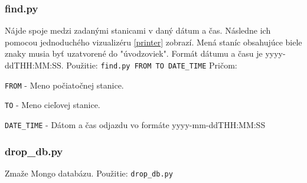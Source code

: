 \documentclass[10pt,xcolor=pdflatex,dvipsnames,table,oneside]{book}
\begin{document}
\subsubsection*{find.py}\label{printer}
\par Nájde spoje medzi zadanými stanicami v daný dátum a čas. Následne ich pomocou jednoduchého vizualizéru \ref{printer} zobrazí. Mená staníc obsahujúce biele znaky musia byť uzatvorené do "úvodzoviek". Formát dátumu a času je yyyy-ddTHH:MM:SS. \newline \newline
Použitie: \verb|find.py FROM TO DATE_TIME|
\newline \newline
Pričom:
\newline
\par \verb|FROM| - Meno počiatočnej stanice.
\newline
\par \verb|TO| - Meno cieľovej stanice.
\newline
\par \verb|DATE_TIME| - Dátom a čas odjazdu vo formáte yyyy-mm-ddTHH:MM:SS
\newline

\subsubsection*{drop\_db.py}
\par Zmaže Mongo databázu.
\newline \newline
Použitie: \verb|drop_db.py|










\end{document}
